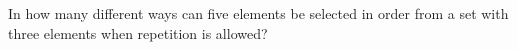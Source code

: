 \documentclass[../main.tex]{subfiles}
\begin{document}
In how many different ways can five elements be selected in order from a set with three elements when repetition is allowed?

\solution
\end{document}
